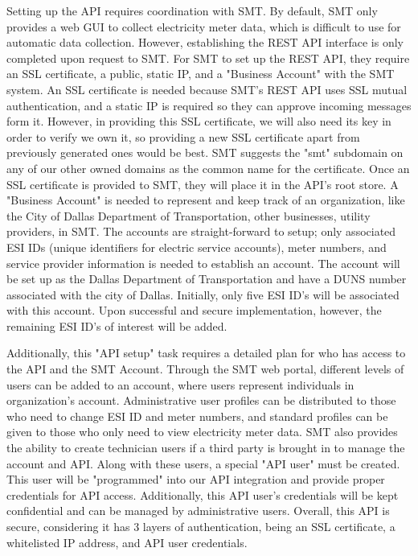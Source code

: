 \documentclass[]{amsldoc}
\begin{document}
Setting up the API requires coordination with SMT. By default, SMT only provides a web GUI to collect electricity meter data, which is difficult to use for automatic data collection. However, establishing the REST API interface is only completed upon request to SMT. For SMT to set up the REST API, they require an SSL certificate, a public, static IP, and a "Business Account" with the SMT system. An SSL certificate is needed because SMT's REST API uses SSL mutual authentication, and a static IP is required so they can approve incoming messages form it. However, in providing this SSL certificate, we will also need its key in order to verify we own it, so providing a new SSL certificate apart from previously generated ones would be best. SMT suggests the "smt" subdomain on any of our other owned domains as the common name for the certificate. Once an SSL certificate is provided to SMT, they will place it in the API's root store. A "Business Account" is needed to represent and keep track of an organization, like the City of Dallas Department of Transportation, other businesses, utility providers, in SMT. The accounts are straight-forward to setup; only associated ESI IDs (unique identifiers for electric service accounts), meter numbers, and service provider information is needed to establish an account. The account will be set up as the Dallas Department of Transportation and have a DUNS number associated with the city of Dallas. Initially, only five ESI ID's will be associated with this account. Upon successful and secure implementation, however, the remaining ESI ID's of interest will be added.

Additionally, this "API setup" task requires a detailed plan for who has access to the API and the SMT Account. Through the SMT web portal, different levels of users can be added to an account, where users represent individuals in organization's account. Administrative user profiles can be distributed to those who need to change ESI ID and meter numbers, and standard profiles can be given to those who only need to view electricity meter data. SMT also provides the ability to create technician users if a third party is brought in to manage the account and API. Along with these users, a special "API user" must be created. This user will be "programmed" into our API integration and provide proper credentials for API access. Additionally, this API user's credentials will be kept confidential and can be managed by administrative users. Overall, this API is secure, considering it has 3 layers of authentication, being an SSL certificate, a whitelisted IP address, and API user credentials.
\end{document}
